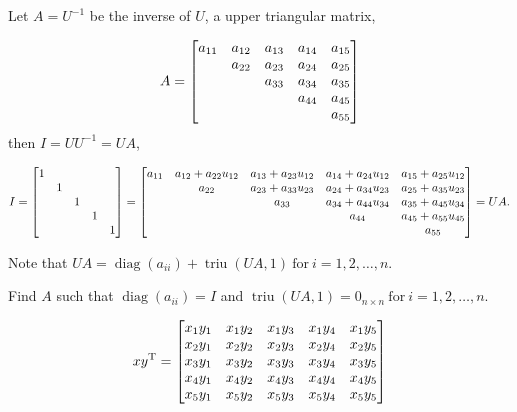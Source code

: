 \documentclass[11pt]{article}
\newcommand{\diag}{\mathop{\mathrm{diag}}}
\newcommand{\triu}{\mathop{\mathrm{triu}}}
\newcommand{\T}{\mathrm{T}}
\begin{document}
\noindent Let $A = U^{-1}$ be the inverse of $U$, a upper triangular matrix,


\begin{align*}
    A = \mqty[
        a_{11} & a_{12} & a_{13} & a_{14} & a_{15}\\
          & a_{22} & a_{23} & a_{24} & a_{25}\\
          &   & a_{33} & a_{34} & a_{35}\\
          &   &   & a_{44} & a_{45}\\
          &   &   &   & a_{55}
        ]
\end{align*}
then $I = UU^{-1} = UA$,


\begin{align*}
    I = \mqty[
        1 &   &   &   &  \\
          & 1 &   &   &  \\
          &   & 1 &   &  \\
          &   &   & 1 &  \\
          &   &   &   & 1
        ]
    = \mqty[
        a_{11} & a_{12} + a_{22} u_{12} & a_{13} + a_{23} u_{12} & a_{14} + a_{24} u_{12} & a_{15} + a_{25} u_{12}\\
          & a_{22} & a_{23} + a_{33} u_{23} & a_{24} + a_{34} u_{23} & a_{25} + a_{35} u_{23}\\
          &   & a_{33} & a_{34} + a_{44} u_{34} & a_{35} + a_{45} u_{34}\\
          &   &   & a_{44} & a_{45} + a_{55} u_{45}\\
          &   &   &   & a_{55}
        ]
    = UA.
\end{align*}



\noindent Note that $UA = \diag(a_{ii}) + \triu(UA, 1)\ \text{for} \ i = 1, 2, \ldots , n$.

\noindent Find $A$ such that $\diag(a_{ii}) = I$ and $\triu(UA, 1) = 0_{n \times n}\ \text{for} \ i = 1, 2, \ldots , n$.

\begin{align*}
    xy^{\T} = \mqty[
        x_{1} y_{1} & x_{1} y_{2} & x_{1} y_{3} & x_{1} y_{4} & x_{1} y_{5}\\
        x_{2} y_{1} & x_{2} y_{2} & x_{2} y_{3} & x_{2} y_{4} & x_{2} y_{5}\\
        x_{3} y_{1} & x_{3} y_{2} & x_{3} y_{3} & x_{3} y_{4} & x_{3} y_{5}\\
        x_{4} y_{1} & x_{4} y_{2} & x_{4} y_{3} & x_{4} y_{4} & x_{4} y_{5}\\
        x_{5} y_{1} & x_{5} y_{2} & x_{5} y_{3} & x_{5} y_{4} & x_{5} y_{5}
    ]
\end{align*}
\end{document}
